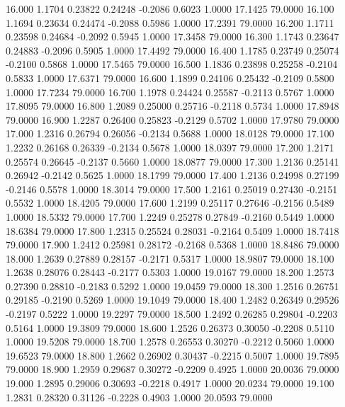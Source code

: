   16.000   1.1704   0.23822   0.24248  -0.2086   0.6023   1.0000  17.1425  79.0000
  16.100   1.1694   0.23634   0.24474  -0.2088   0.5986   1.0000  17.2391  79.0000
  16.200   1.1711   0.23598   0.24684  -0.2092   0.5945   1.0000  17.3458  79.0000
  16.300   1.1743   0.23647   0.24883  -0.2096   0.5905   1.0000  17.4492  79.0000
  16.400   1.1785   0.23749   0.25074  -0.2100   0.5868   1.0000  17.5465  79.0000
  16.500   1.1836   0.23898   0.25258  -0.2104   0.5833   1.0000  17.6371  79.0000
  16.600   1.1899   0.24106   0.25432  -0.2109   0.5800   1.0000  17.7234  79.0000
  16.700   1.1978   0.24424   0.25587  -0.2113   0.5767   1.0000  17.8095  79.0000
  16.800   1.2089   0.25000   0.25716  -0.2118   0.5734   1.0000  17.8948  79.0000
  16.900   1.2287   0.26400   0.25823  -0.2129   0.5702   1.0000  17.9780  79.0000
  17.000   1.2316   0.26794   0.26056  -0.2134   0.5688   1.0000  18.0128  79.0000
  17.100   1.2232   0.26168   0.26339  -0.2134   0.5678   1.0000  18.0397  79.0000
  17.200   1.2171   0.25574   0.26645  -0.2137   0.5660   1.0000  18.0877  79.0000
  17.300   1.2136   0.25141   0.26942  -0.2142   0.5625   1.0000  18.1799  79.0000
  17.400   1.2136   0.24998   0.27199  -0.2146   0.5578   1.0000  18.3014  79.0000
  17.500   1.2161   0.25019   0.27430  -0.2151   0.5532   1.0000  18.4205  79.0000
  17.600   1.2199   0.25117   0.27646  -0.2156   0.5489   1.0000  18.5332  79.0000
  17.700   1.2249   0.25278   0.27849  -0.2160   0.5449   1.0000  18.6384  79.0000
  17.800   1.2315   0.25524   0.28031  -0.2164   0.5409   1.0000  18.7418  79.0000
  17.900   1.2412   0.25981   0.28172  -0.2168   0.5368   1.0000  18.8486  79.0000
  18.000   1.2639   0.27889   0.28157  -0.2171   0.5317   1.0000  18.9807  79.0000
  18.100   1.2638   0.28076   0.28443  -0.2177   0.5303   1.0000  19.0167  79.0000
  18.200   1.2573   0.27390   0.28810  -0.2183   0.5292   1.0000  19.0459  79.0000
  18.300   1.2516   0.26751   0.29185  -0.2190   0.5269   1.0000  19.1049  79.0000
  18.400   1.2482   0.26349   0.29526  -0.2197   0.5222   1.0000  19.2297  79.0000
  18.500   1.2492   0.26285   0.29804  -0.2203   0.5164   1.0000  19.3809  79.0000
  18.600   1.2526   0.26373   0.30050  -0.2208   0.5110   1.0000  19.5208  79.0000
  18.700   1.2578   0.26553   0.30270  -0.2212   0.5060   1.0000  19.6523  79.0000
  18.800   1.2662   0.26902   0.30437  -0.2215   0.5007   1.0000  19.7895  79.0000
  18.900   1.2959   0.29687   0.30272  -0.2209   0.4925   1.0000  20.0036  79.0000
  19.000   1.2895   0.29006   0.30693  -0.2218   0.4917   1.0000  20.0234  79.0000
  19.100   1.2831   0.28320   0.31126  -0.2228   0.4903   1.0000  20.0593  79.0000
